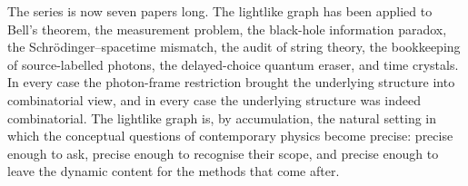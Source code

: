 \documentclass[11pt]{article}
\begin{document}
The series is now seven papers long. The lightlike graph has been applied to Bell's theorem, the measurement problem, the black-hole information paradox, the Schr\"odinger--spacetime mismatch, the audit of string theory, the bookkeeping of source-labelled photons, the delayed-choice quantum eraser, and time crystals. In every case the photon-frame restriction brought the underlying structure into combinatorial view, and in every case the underlying structure was indeed combinatorial. The lightlike graph is, by accumulation, the natural setting in which the conceptual questions of contemporary physics become precise: precise enough to ask, precise enough to recognise their scope, and precise enough to leave the dynamic content for the methods that come after.
\end{document}
